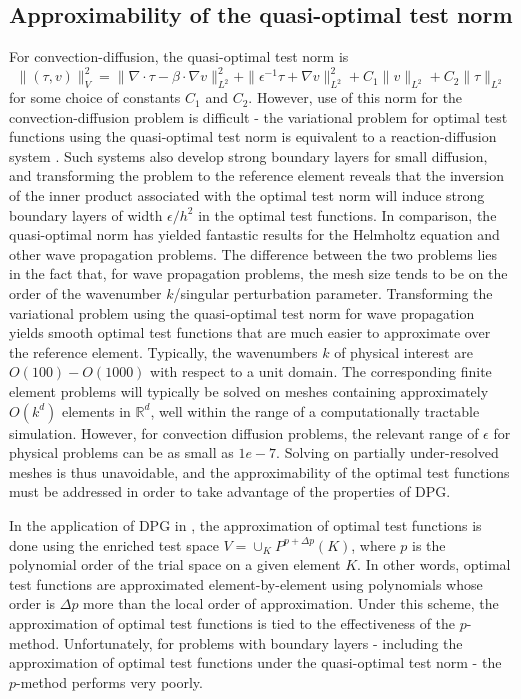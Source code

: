 \documentclass[11pt,onecolumn]{scrartcl}
\newcommand{\grad}{\nabla}
\renewcommand{\div}{\grad \cdot}
\begin{document}
\subsection{Approximability of the quasi-optimal test norm}%

For convection-diffusion, the quasi-optimal test norm is 
\[
\|\left(\tau, v\right)\|_V^2 = \| \div \tau - \beta \cdot \grad v \|_{L^2}^2 + \| \epsilon^{-1} \tau + \grad v \|_{L^2}^2 + C_1\|v\|_{L^2} + C_2\|\tau\|_{L^2}
\]
for some choice of constants $C_1$ and $C_2$.  
However, use of this norm for the convection-diffusion problem is difficult - the variational problem for optimal test functions using the quasi-optimal test norm is equivalent to a reaction-diffusion system \cite{DBLP:journals/procedia/NiemiCC11}.  Such systems also develop strong boundary layers for small diffusion, and transforming the problem to the reference element reveals that the inversion of the inner product associated with the optimal test norm will induce strong boundary layers of width $\epsilon/h^2$ in the optimal test functions.  In comparison, the quasi-optimal norm has yielded fantastic results for the Helmholtz equation and other wave propagation problems. The difference between the two problems lies in the fact that, for wave propagation problems, the mesh size tends to be on the order of the wavenumber $k$/singular perturbation parameter. Transforming the variational problem using the quasi-optimal test norm for wave propagation yields smooth optimal test functions that are much easier to approximate over the reference element. Typically, the wavenumbers $k$ of physical interest are $O(100)-O(1000)$ with respect to a unit domain. The corresponding finite element problems will typically be solved on meshes containing approximately $O(k^d)$ elements in $\mathbb{R}^d$, well within the range of a computationally tractable simulation. However, for convection diffusion problems, the relevant range of $\epsilon$ for physical problems can be as small as $1e-7$. Solving on partially under-resolved meshes is thus unavoidable, and the approximability of the optimal test functions must be addressed in order to take advantage of the properties of DPG.  

In the application of DPG in \cite{DPG1,DPG2,DPG3,DPG4}, the approximation of optimal test functions is done using the enriched test space $V = \cup_{K} P^{p+\Delta p}(K)$, where $p$ is the polynomial order of the trial space on a given element $K$.  In other words, optimal test functions are approximated element-by-element using polynomials whose order is $\Delta p$ more than the local order of approximation.  Under this scheme, the approximation of optimal test functions is tied to the effectiveness of the $p$-method.  Unfortunately, for problems with boundary layers - including the approximation of optimal test functions under the quasi-optimal test norm - the $p$-method performs very poorly.  
\end{document}
